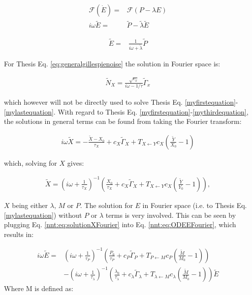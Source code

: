 \begin{align}
\label{nnt:eq:ODEEFourier}
\mathcal{F} \left( \dot{E} \right) = & \mathcal{F} \left( P - \lambda E \right) \nonumber \\
%
i\omega \tilde{E} = & \tilde{P} - \tilde{\lambda} \tilde{E}
\end{align}

\begin{align}
 \tilde{E} = & \frac{1}{i\omega+\tilde{\lambda}} \tilde{P} 
\end{align}

For Thesis Eq. \ref{eq:generalgillespienoise} the solution in Fourier space is:

\begin{align}
\tilde{N}_X = \frac{\sqrt{c_x}}{i\omega - 1/\tau} \tilde{\Gamma}_x
\end{align}

which however will not be directly used to solve Thesis Eq. \ref{myfirstequation}-\ref{mylastequation}. With regard to Thesis Eq. \ref{myfirstequation}-\ref{mythirdequation}, the solutions in general terms can be found from taking the Fourier transform:

\begin{align}
i \omega \tilde{X} = - \frac{\tilde{X}-X_0}{\tau_X} + c_X \tilde{\Gamma}_X + T_{X \leftarrow Y} c_X (\frac{\tilde{Y}}{X_0} - 1)
\end{align}

which, solving for $X$ gives:

\begin{align}
\label{nnt:eq:solutionXFourier}
\tilde{X} = \left( i \omega + \frac{1}{\tau_X} \right)^{-1} \left( \frac{X_0}{\tau_X} + c_X \tilde{\Gamma}_X + T_{X \leftarrow Y} c_X (\frac{\tilde{Y}}{Y_0} - 1) \right)
,
\end{align}

$X$ being either $\lambda$, $M$ or $P$.
%
The solution for $E$ in Fourier space (i.e. to Thesis Eq. \ref{mylastequation}) without $P$ or $\lambda$ terms is very involved. This can be seen by plugging Eq. \ref{nnt:eq:solutionXFourier} into Eq. \ref{nnt:eq:ODEEFourier}, which results in:

\begin{align}
\label{nnt:eq:ODEEFourierExpanded}
i\omega \tilde{E} = & 
\left( i \omega + \frac{1}{\tau_P} \right)^{-1} \left( \frac{P_0}{\tau_P} + c_P \tilde{\Gamma}_P + T_{P \leftarrow M} c_P (\frac{\tilde{M}}{M_0} - 1) \right)
     \nonumber \\
    & -
    \left( i \omega + \frac{1}{\tau_\lambda} \right)^{-1} \left( \frac{\lambda_0}{\tau_\lambda} + c_\lambda \tilde{\Gamma}_\lambda + T_{\lambda \leftarrow M} c_\lambda (\frac{\tilde{M}}{M_0} - 1) \right)
     \tilde{E}
\end{align}
Where M is defined as:

